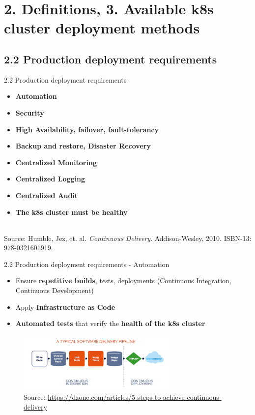 \documentclass{beamer}
\begin{document}
\section{2. Definitions, 3. Available k8s cluster deployment methods}
\subsection{2.2 Production deployment requirements}
\begin{frame}{2.2 Production deployment requirements}%
\begin{itemize}
	\item \textbf{Automation}
	\item \textbf{Security}
	\item \textbf{High Availability, failover, fault-tolerancy}
	\item \textbf{Backup and restore, Disaster Recovery}
	\item \textbf{Centralized Monitoring}
	\item \textbf{Centralized Logging}
	\item \textbf{Centralized Audit}
	\item \textbf{The k8s cluster must be healthy}
\end{itemize}
\\
\tiny{Source: Humble, Jez, et. al. \textit{Continuous Delivery}. Addison-Wesley, 2010. ISBN-13: 978-0321601919.}
\end{frame}

\begin{frame}{2.2 Production deployment requirements - Automation}%
\begin{itemize}
	\item Ensure \textbf{repetitive builds}, tests, deployments (Continuous Integration, Continuous Development)
	\item Apply \textbf{Infrastructure as Code}
	\item \textbf{Automated tests} that verify the \textbf{health of the k8s cluster}
\end{itemize}
\begin{figure}
	\includegraphics[width=8cm]{figures/cicd-pipeline.png}
	\label{fig:cicd-pipeline} \\
	\tiny{Source: \url{https://dzone.com/articles/5-steps-to-achieve-continuous-delivery}}
\end{figure}
\end{frame}
\end{document}
